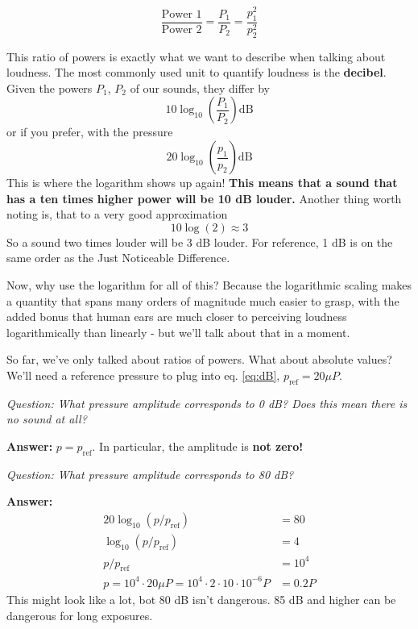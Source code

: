 \begin{equation}
    \frac{\text{Power 1}}{\text{Power 2}} = \frac{P_1}{P_2} = \frac{p_1^2}{p_2^2}
\end{equation}

This ratio of powers is exactly what we want to describe when talking about loudness. The most commonly used unit to quantify loudness is the \textbf{decibel}. Given the powers $P_1$, $P_2$ of our sounds, they differ by 
\begin{equation}
    10 \log_{10}(\frac{P_1}{P_2}) \text{dB}
\end{equation}
or if you prefer, with the pressure
\begin{equation}\label{eq:dB}
    20 \log_{10}(\frac{p_1}{p_2}) \text{dB}
\end{equation}
This is where the logarithm shows up again!
\textbf{This means that a sound that has a ten times higher power will be 10 dB louder.}
Another thing worth noting is, that to a very good approximation 
\begin{equation}
    10 \log(2) \approx 3 
\end{equation}
So a sound two times louder will be 3 dB louder. For reference, 1 dB is on the same order as the Just Noticeable Difference. 

Now, why use the logarithm for all of this? Because the logarithmic scaling makes a quantity that spans many orders of magnitude much easier to grasp, with the added bonus that human ears are much closer to perceiving loudness logarithmically than linearly - but we'll talk about that in a moment.

So far, we've only talked about ratios of powers. What about absolute values? We'll need a reference pressure to plug into eq. \ref{eq:dB}, $p_{\text{ref}} = 20 \mu P$.

\textit{Question: What pressure amplitude corresponds to 0 dB? Does this mean there is no sound at all?}

\textbf{Answer:} $p = p_{\text{ref}}$. In particular, the amplitude is \textbf{not zero!}

\textit{Question: What pressure amplitude corresponds to 80 dB?}

\textbf{Answer:} 
\begin{align*}
    20 \log_{10}(p/p_{\text{ref}}) &= 80  \\
    \log_{10}(p/p_{\text{ref}}) &= 4  \\
    p/p_{\text{ref}} &= 10^4 \\
    p = 10^4 \cdot 20 \mu P = 10^4 \cdot 2 \cdot 10 \cdot 10^{-6} P &= 0.2 P
\end{align*}
This might look like a lot, bot 80 dB isn't dangerous. 85 dB and higher can be dangerous for long exposures.


